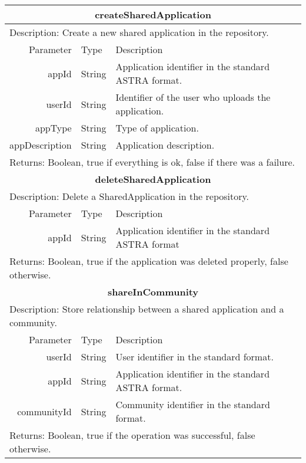 \begin{table}[h!]
	\small
    \begin{center}
		\begin{tabular}{||r|l|l||}
        
		\hline \hline
		\multicolumn{3}{||c||}{\bfseries{createSharedApplication}} \\
		\hline
		\hline 
		\multicolumn{3}{||l||}{Description: Create a new shared application in the
		repository.} \\
		\hline \hline
			Parameter & Type & Description \\
		\hline \hline
			appId & String & Application identifier in the standard ASTRA format. \\
			userId & String & Identifier of the user who uploads the application. \\
			appType & String & Type of application. \\
			appDescription & String & Application description. \\
		\hline \hline
		\multicolumn{3}{||l||}{Returns: Boolean, true if everything is ok, false if
		there was a failure.} \\
		\hline \hline
		
		\hline \hline
		\multicolumn{3}{||c||}{\bfseries{deleteSharedApplication}} \\
		\hline
		\hline 
		\multicolumn{3}{||l||}{Description: Delete a SharedApplication in the
		repository.} \\ \hline \hline
			Parameter & Type & Description \\
		\hline \hline
			appId & String & Application identifier in the standard ASTRA format \\
		\hline \hline
		\multicolumn{3}{||l||}{Returns: Boolean, true if the application was deleted
		properly, false otherwise.} \\
		\hline \hline
		
		\hline \hline
		\multicolumn{3}{||c||}{\bfseries{shareInCommunity}} \\
		\hline
		\hline 
		\multicolumn{3}{||l||}{Description: Store relationship between a shared 
		application and a community.} \\ \hline \hline
			Parameter & Type & Description \\
		\hline \hline
			userId & String & User identifier in the standard format. \\
			appId & String & Application identifier in the standard ASTRA format. \\
			communityId & String & Community identifier in the standard format. \\
		\hline \hline
		\multicolumn{3}{||l||}{Returns: Boolean, true if the operation was successful,
		false otherwise.} \\ \hline \hline
		

\end{tabular}
\end{center}
\end{table}
